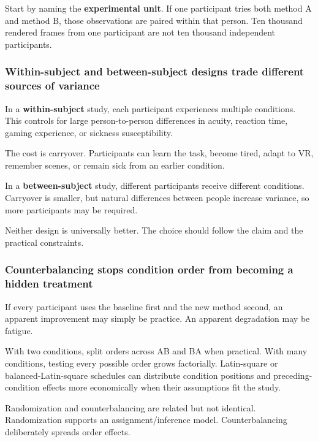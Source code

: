 Start by naming the \textbf{experimental unit}. If one participant tries both method A and method B, those observations are paired within that person. Ten thousand rendered frames from one participant are not ten thousand independent participants.

\subsubsection{Within-subject and between-subject designs trade different sources of variance}\label{04-visual-computing-ii-ch035-within-subject-and-between-subject-designs-trade-different-sources-of-variance}

In a \textbf{within-subject} study, each participant experiences multiple conditions. This controls for large person-to-person differences in acuity, reaction time, gaming experience, or sickness susceptibility.

The cost is carryover. Participants can learn the task, become tired, adapt to VR, remember scenes, or remain sick from an earlier condition.

In a \textbf{between-subject} study, different participants receive different conditions. Carryover is smaller, but natural differences between people increase variance, so more participants may be required.

Neither design is universally better. The choice should follow the claim and the practical constraints.

\subsubsection{Counterbalancing stops condition order from becoming a hidden treatment}\label{04-visual-computing-ii-ch035-counterbalancing-stops-condition-order-from-becoming-a-hidden-treatment}

If every participant uses the baseline first and the new method second, an apparent improvement may simply be practice. An apparent degradation may be fatigue.

With two conditions, split orders across AB and BA when practical. With many conditions, testing every possible order grows factorially. Latin-square or balanced-Latin-square schedules can distribute condition positions and preceding-condition effects more economically when their assumptions fit the study.

Randomization and counterbalancing are related but not identical. Randomization supports an assignment/inference model. Counterbalancing deliberately spreads order effects.

